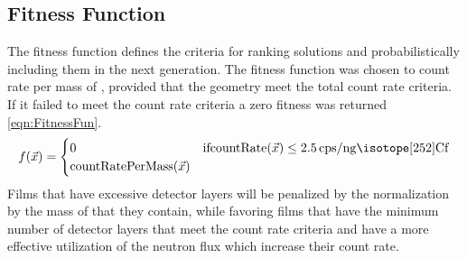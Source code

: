 \subsection{Fitness Function}
\label{sec:FitnessFunc}
The fitness function defines the criteria for ranking solutions and probabilistically including them in the next generation.
The fitness function was chosen to count rate per mass of , provided that the geometry meet the total count rate criteria.
If it failed to meet the count rate criteria a zero fitness was returned \eqref{eqn:FitnessFun}.
\begin{align}
    \label{eqn:FitnessFun}
    f(\vec{x})
    = \begin{cases}
    0 & \text{if} \text{countRate}(\vec{x}) \leq \SI{2.5}{cps\per\nano\gram\iso[252]{Cf}} \\
    \text{countRatePerMass}(\vec{x})
    \end{cases}
\end{align}
Films that have excessive detector layers will be penalized by the normalization by the mass of  that they contain, while favoring films that have the minimum number of detector layers that meet the count rate criteria and have a more effective utilization of the neutron flux which increase their count rate.

